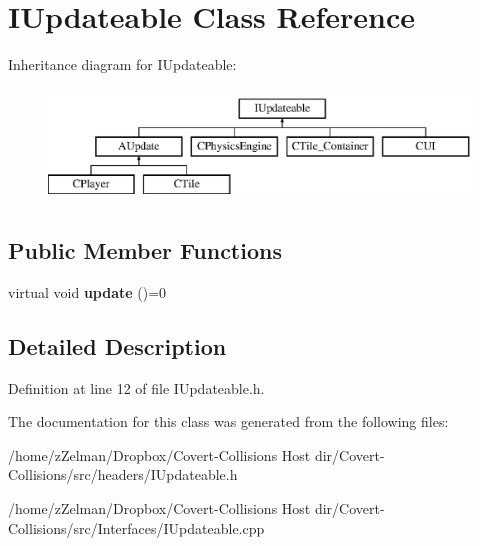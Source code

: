 \hypertarget{classIUpdateable}{\section{I\-Updateable Class Reference}
\label{classIUpdateable}
}
Inheritance diagram for I\-Updateable\-:\begin{figure}[H]
\begin{center}
\leavevmode
\includegraphics[height=3.000000cm]{classIUpdateable}
\end{center}
\end{figure}
\subsection*{Public Member Functions}
\begin{DoxyCompactItemize}
\item 
\hypertarget{classIUpdateable_a46d178a1ecdab33bcaad25d9b38582a5}{virtual void {\bfseries update} ()=0}\label{classIUpdateable_a46d178a1ecdab33bcaad25d9b38582a5}

\end{DoxyCompactItemize}


\subsection{Detailed Description}


Definition at line 12 of file I\-Updateable.\-h.



The documentation for this class was generated from the following files\-:\begin{DoxyCompactItemize}
\item 
/home/z\-Zelman/\-Dropbox/\-Covert-\/\-Collisions Host dir/\-Covert-\/\-Collisions/src/headers/I\-Updateable.\-h\item 
/home/z\-Zelman/\-Dropbox/\-Covert-\/\-Collisions Host dir/\-Covert-\/\-Collisions/src/\-Interfaces/I\-Updateable.\-cpp\end{DoxyCompactItemize}
